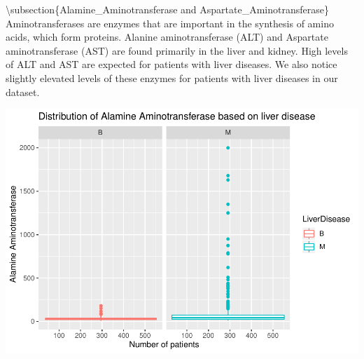 \documentclass[]{article}
\newenvironment{Shaded}{\begin{snugshade}}{\end{snugshade}}
\newcommand{\CommentTok}[1]{\textcolor[rgb]{0.56,0.35,0.01}{\textit{#1}}}
\newcommand{\DataTypeTok}[1]{\textcolor[rgb]{0.13,0.29,0.53}{#1}}
\newcommand{\KeywordTok}[1]{\textcolor[rgb]{0.13,0.29,0.53}{\textbf{#1}}}
\newcommand{\NormalTok}[1]{#1}
\newcommand{\OperatorTok}[1]{\textcolor[rgb]{0.81,0.36,0.00}{\textbf{#1}}}
\newcommand{\StringTok}[1]{\textcolor[rgb]{0.31,0.60,0.02}{#1}}
\begin{document}
\textbackslash subsection\{Alamine\_Aminotransferase and
Aspartate\_Aminotransferase\} Aminotransferases are enzymes that are
important in the synthesis of amino acids, which form proteins. Alanine
aminotransferase (ALT) and Aspartate aminotransferase (AST) are found
primarily in the liver and kidney. High levels of ALT and AST are
expected for patients with liver diseases. We also notice slightly
elevated levels of these enzymes for patients with liver diseases in our
dataset.

\begin{Shaded}
\end{Shaded}

\includegraphics{LiverDisease_files/figure-latex/unnamed-chunk-18-1.pdf}
\end{document}
